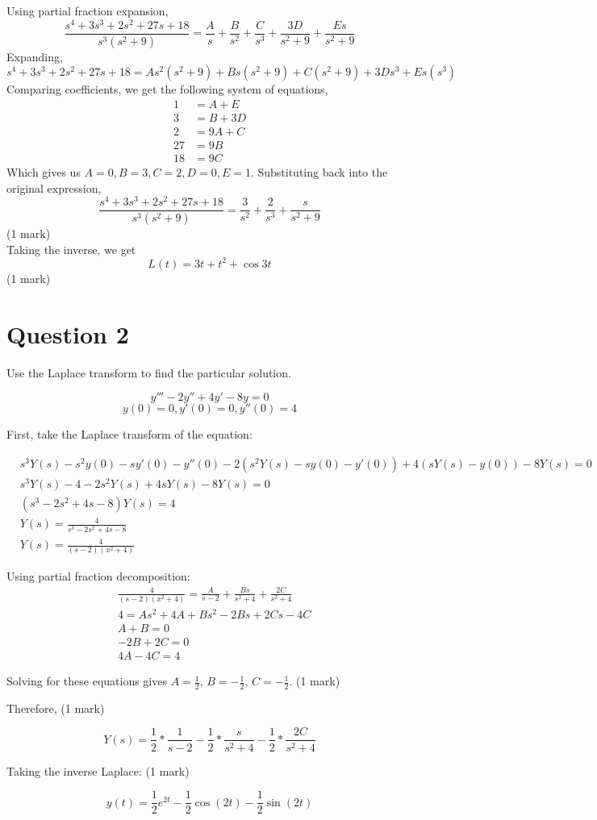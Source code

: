 \documentclass[12pt]{article}
\begin{document}
Using partial fraction expansion, $$\frac{s^4 + 3s^3 + 2s^2 + 27s + 18}{s^3(s^2+9)} = \frac{A}{s} + \frac{B}{s^2} + \frac{C}{s^3} + \frac{3D}{s^2+9} + \frac{Es}{s^2+9}$$ \indent Expanding, $$s^4 + 3s^3 + 2s^2 + 27s + 18 = As^2(s^2+9) + Bs(s^2+9) + C(s^2+9) + 3Ds^3 + Es(s^3)$$ \indent Comparing coefficients, we get the following system of equations,
\begin{align*}
  1 &= A + E \\
  3 &= B + 3D \\
  2 &= 9A + C \\
  27 &= 9B \\
  18 &= 9C
\end{align*}
\indent Which gives us $A = 0, B = 3, C = 2, D = 0, E = 1$. Substituting back into the original expression, $$\frac{s^4 + 3s^3 + 2s^2 + 27s + 18}{s^3(s^2+9)} = \frac{3}{s^2} + \frac{2}{s^3} + \frac{s}{s^2+9}$$ \hfill (1 mark) \\
\indent Taking the inverse, we get $$L(t) = 3t + t^2 + \cos3t$$ \hfill (1 mark)

\section*{Question 2}

Use the Laplace transform to find the particular solution.

$$y''' - 2y'' + 4y' - 8y = 0$$
$$y(0) = 0, y'(0) = 0, y''(0) = 4$$

\noindent First, take the Laplace transform of the equation:

\begin{align*}
  &s^3Y(s) - s^2y(0) - sy'(0) - y''(0) - 2(s^2Y(s) - sy(0) - y'(0)) + 4(sY(s) - y(0)) - 8Y(s) = 0
  \\ &s^3Y(s) - 4 - 2s^2Y(s) + 4sY(s) - 8Y(s) = 0
  \\ &(s^3 - 2s^2 + 4s - 8)Y(s) = 4
  \\ &Y(s) = \frac{4}{s^3 - 2s^2 + 4s - 8}
  \\ &Y(s) = \frac{4}{(s-2)(x^2 + 4)} \tag{1 mark}
\end{align*}

\noindent Using partial fraction decomposition:
\begin{align*}
  &\frac{4}{(s-2)(x^2 + 4)} = \frac{A}{s-2} + \frac{Bs}{s^2 + 4} + \frac{2C}{s^2 + 4}
  \\ &4 = As^2 + 4A + Bs^2 - 2Bs + 2Cs - 4C
  \\ &A + B = 0
  \\ &-2B + 2C = 0
  \\ &4A - 4C = 4 \tag{1 mark}
\end{align*}

\noindent Solving for these equations gives $A = \frac{1}{2}$, $B = -\frac{1}{2}$, $C = -\frac{1}{2}$. \hfill (1 mark)

\noindent Therefore, \hfill (1 mark)

$$Y(s) = \frac{1}{2}*\frac{1}{s-2} - \frac{1}{2}*\frac{s}{s^2 + 4} - \frac{1}{2}*\frac{2C}{s^2 + 4}$$

\noindent Taking the inverse Laplace: \hfill (1 mark)

$$y(t) = \frac{1}{2}e^{2t} - \frac{1}{2}\cos(2t) - \frac{1}{2}\sin(2t)$$
\end{document}
